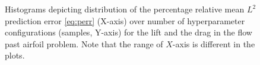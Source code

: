 \documentclass[a4paper]{article}
\numberwithin{equation}{section}
\numberwithin{equation}{section}
\theoremstyle{definition}
\theoremstyle{myremarkstyle}
\begin{document}
\begin{figure}[htbp]
\caption{Histograms depicting distribution of the percentage relative mean $L^2$ prediction error \eqref{eq:perr} (X-axis) over number of hyperparameter configurations (samples, Y-axis)  for the lift and the drag in the flow past airfoil problem. Note that the range of $X$-axis is different in the plots.}
\label{fig:afoilHistErr}
\end{figure}
\end{document}
